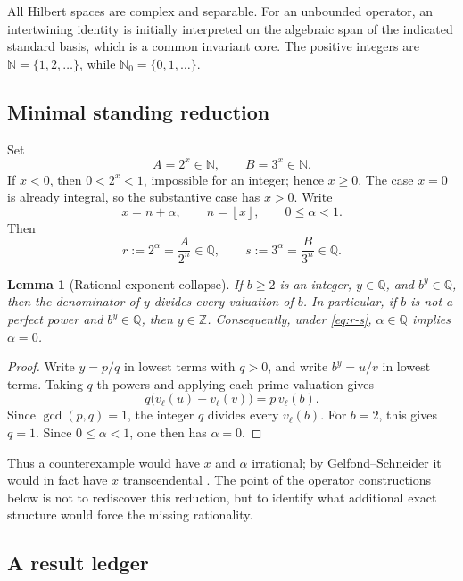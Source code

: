 \documentclass[11pt,oneside]{article}
\newtheorem{lemma}[theorem]{Lemma}
\theoremstyle{definition}
\theoremstyle{remark}
\newcommand{\N}{\mathbb N}
\newcommand{\Nzero}{\mathbb N_0}
\newcommand{\Z}{\mathbb Z}
\newcommand{\Q}{\mathbb Q}
\newcommand{\floor}[1]{\left\lfloor #1\right\rfloor}
\begin{document}
All Hilbert spaces are complex and separable.  For an unbounded operator,
an intertwining identity is initially interpreted on the algebraic span
of the indicated standard basis, which is a common invariant core.
The positive integers are \(\N=\{1,2,\ldots\}\), while
\(\Nzero=\{0,1,\ldots\}\).

\subsection{Minimal standing reduction}

Set
\[
        A=2^x\in\N,\qquad B=3^x\in\N.
\]
If \(x<0\), then \(0<2^x<1\), impossible for an integer; hence \(x\geq0\).
The case \(x=0\) is already integral, so the substantive case has \(x>0\).
Write
\[
        x=n+\alpha,\qquad n=\floor{x},\qquad 0\leq\alpha<1.
\]
Then
\begin{equation}\label{eq:r-s}
        r:=2^\alpha=\frac{A}{2^n}\in\Q,\qquad
        s:=3^\alpha=\frac{B}{3^n}\in\Q.
\end{equation}

\begin{lemma}[Rational-exponent collapse]\label{lem:rational-collapse}
If \(b\geq2\) is an integer, \(y\in\Q\), and \(b^y\in\Q\), then the
denominator of \(y\) divides every valuation of \(b\).  In particular,
if \(b\) is not a perfect power and \(b^y\in\Q\), then \(y\in\Z\).
Consequently, under \eqref{eq:r-s}, \(\alpha\in\Q\) implies
\(\alpha=0\).
\end{lemma}

\begin{proof}
Write \(y=p/q\) in lowest terms with \(q>0\), and write
\(b^y=u/v\) in lowest terms.  Taking \(q\)-th powers and applying each
prime valuation gives
\[
        q\bigl(v_\ell(u)-v_\ell(v)\bigr)=p\,v_\ell(b).
\]
Since \(\gcd(p,q)=1\), the integer \(q\) divides every \(v_\ell(b)\).
For \(b=2\), this gives \(q=1\).  Since \(0\leq\alpha<1\), one then has
\(\alpha=0\).
\end{proof}

Thus a counterexample would have \(x\) and \(\alpha\) irrational; by
Gelfond--Schneider it would in fact have \(x\) transcendental
\cite{Gelfond,Schneider,BakerBook}.  The point
of the operator constructions below is not to rediscover this reduction,
but to identify what additional exact structure would force the missing
rationality.

\subsection{A result ledger}
\end{document}
